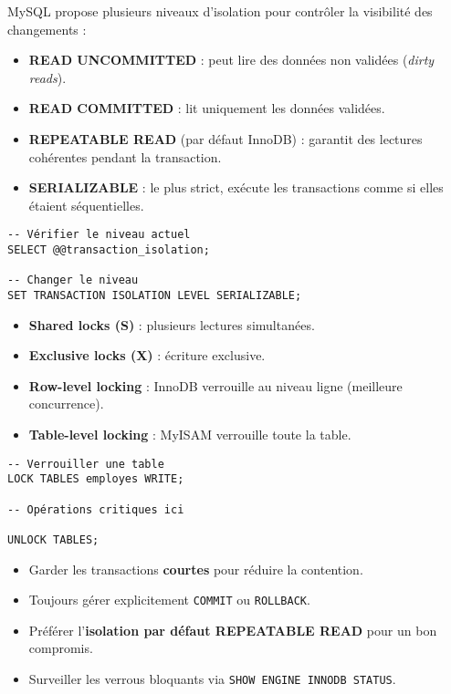 \documentclass[a4paper,11pt]{article}
\begin{document}
\begin{tcolorbox}[colback=orange!5!white,colframe=orange!75!black,title=Niveaux d’isolation]
MySQL propose plusieurs niveaux d’isolation pour contrôler la visibilité des changements :
\begin{itemize}
  \item \textbf{READ UNCOMMITTED} : peut lire des données non validées (\textit{dirty reads}).
  \item \textbf{READ COMMITTED} : lit uniquement les données validées.
  \item \textbf{REPEATABLE READ} (par défaut InnoDB) : garantit des lectures cohérentes pendant la transaction.
  \item \textbf{SERIALIZABLE} : le plus strict, exécute les transactions comme si elles étaient séquentielles.
\end{itemize}

\begin{verbatim}
-- Vérifier le niveau actuel
SELECT @@transaction_isolation;

-- Changer le niveau
SET TRANSACTION ISOLATION LEVEL SERIALIZABLE;
\end{verbatim}
\end{tcolorbox}

\begin{tcolorbox}[colback=red!5!white,colframe=red!75!black,title=Verrous (Locks)]
\begin{itemize}
  \item \textbf{Shared locks (S)} : plusieurs lectures simultanées.
  \item \textbf{Exclusive locks (X)} : écriture exclusive.
  \item \textbf{Row-level locking} : InnoDB verrouille au niveau ligne (meilleure concurrence).
  \item \textbf{Table-level locking} : MyISAM verrouille toute la table.
\end{itemize}

\begin{verbatim}
-- Verrouiller une table
LOCK TABLES employes WRITE;

-- Opérations critiques ici

UNLOCK TABLES;
\end{verbatim}
\end{tcolorbox}

\begin{tcolorbox}[colback=teal!5!white,colframe=teal!60!black,title=Bonnes pratiques transactions]
\begin{itemize}
  \item Garder les transactions \textbf{courtes} pour réduire la contention.
  \item Toujours gérer explicitement \texttt{COMMIT} ou \texttt{ROLLBACK}.
  \item Préférer l’\textbf{isolation par défaut REPEATABLE READ} pour un bon compromis.
  \item Surveiller les verrous bloquants via \texttt{SHOW ENGINE INNODB STATUS}.
\end{itemize}
\end{tcolorbox}
\end{document}
